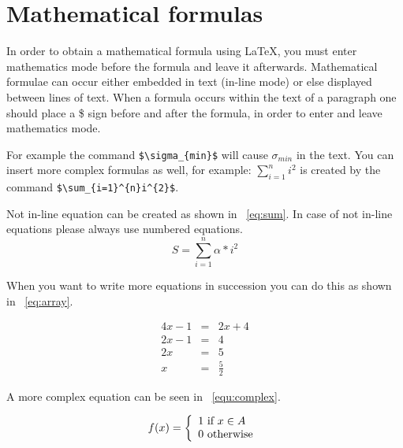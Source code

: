 \documentclass[twoside,b5paper,10pt]{article}
\begin{document}
\section{Mathematical formulas}
\label{sec:Mathema-formula}

In order to obtain a mathematical formula using \LaTeX, you must
enter mathematics mode before the formula and leave it afterwards.
Mathematical formulae can occur either embedded in text (in-line
mode) or else displayed between lines of text. When a formula occurs
within the text of a paragraph one should place a \$ sign before and
after the formula, in order to enter and leave mathematics mode.

For example the command \verb|$\sigma_{min}$| will cause
$\sigma_{min}$ in the text. You can insert more complex formulas as
well, for example: $\sum_{i=1}^{n}i^{2}$ is created by the command
\verb|$\sum_{i=1}^{n}i^{2}$|.

Not in-line equation can be created as shown in
\equationname~\eqref{eq:sum}. In case of not in-line equations please
always use numbered equations.
\begin{equation}
S=\sum_{i=1}^{n}\alpha*i^2 \label{eq:sum}
\end{equation}

When you want to write more equations in succession you can do this
as shown in \equationname~\eqref{eq:array}.



\begin{eqnarray}
  \label{eq:array}
4x-1 &=& 2x+4 \nonumber \\
2x-1 &=& 4 \\
2x &=& 5 \nonumber \\
 x &=&  \frac{5}{2} \nonumber
\end{eqnarray}

A more complex equation can be seen in \equationname
~\ref{equ:complex}.

\begin{equation}
 \label{equ:complex}
f(x) = \left\{ {
\begin{array}{*{20}l}
   {1\ \mbox{if} \ x \in A}  \\
   {0\ \mbox{otherwise}\,}  \\
\end{array}} \right.
\end{equation}
\end{document}
